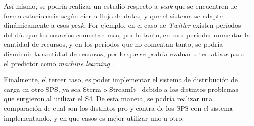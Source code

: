 Así mismo, se podría realizar un estudio respecto a \textit{peak} que se encuentren de forma estacionaria según cierto flujo de datos, y que el sistema se adapte dinámicamente a esos \textit{peak}. Por ejemplo, en el caso de \textit{Twitter} existen períodos del día que los usuarios comentan más, por lo tanto, en esos períodos aumentar la cantidad de recursos, y en los períodos que no comentan tanto, se podría disminuir la cantidad de recursos, por lo que se podría evaluar alternativas para el predictor como \textit{machine learning} \citep{bookMohri2012}.

Finalmente, el tercer caso, es poder implementar el sistema de distribución de carga en otro SPS, ya sea Storm \citep{stormtwitter} o StreamIt \citep{ThiesKA02}, debido a los distintos problemas que surgieron al utilizar el S4. De esta manera, se podría realizar una comparación de cual son los distintos pro y contra de los SPS con el sistema implementando, y en que casos es mejor utilizar uno u otro.